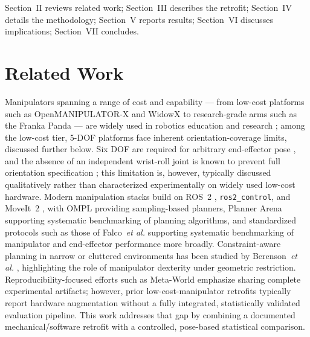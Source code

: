 \documentclass[conference]{IEEEtran}
\begin{document}
	Section~II reviews related work; Section~III describes the retrofit;
	Section~IV details the methodology; Section~V reports results;
	Section~VI discusses implications; Section~VII concludes.
	
	\section{Related Work}
	\label{sec:related_work}
	
	Manipulators spanning a range of cost and capability — from
	low-cost platforms such as OpenMANIPULATOR-X
	\cite{robotis2023openmanipulator} and WidowX \cite{zhao2021widowx} to
	research-grade arms such as the Franka Panda \cite{franka2023panda} —
	are widely used in robotics education and research
	\cite{muepu2025toward}; among the low-cost tier, 5-DOF platforms
	face inherent orientation-coverage limits, discussed further below.
	Six DOF are required for arbitrary end-effector pose
	\cite{craig2005introduction}, and the absence of an independent
	wrist-roll joint is known to prevent full orientation specification
	\cite{craig2005introduction, whitney1969resolved}; this limitation is,
	however, typically discussed qualitatively rather than characterized
	experimentally on widely used low-cost hardware. Modern manipulation
	stacks build on ROS~2 \cite{macenski2022ros2control},
	\texttt{ros2\_control}, and MoveIt~2 \cite{chitta2016moveit}, with
	OMPL \cite{sucan2012ompl} providing sampling-based planners,
	Planner Arena \cite{plannerarena} supporting systematic benchmarking
	of planning algorithms, and standardized protocols such as those of
	Falco~\textit{et al.} \cite{norton2020developing} supporting
	systematic benchmarking of manipulator and end-effector performance
	more broadly. Constraint-aware planning in narrow or cluttered
	environments has
	been studied by Berenson~\textit{et al.} \cite{berenson2011task},
	highlighting the role of manipulator dexterity under geometric
	restriction. Reproducibility-focused efforts such as Meta-World
	\cite{benchmarkrobotlearning} emphasize sharing complete experimental
	artifacts; however, prior low-cost-manipulator retrofits typically
	report hardware augmentation without a fully integrated,
	statistically validated evaluation pipeline. This work addresses that
	gap by combining a documented mechanical/software retrofit with a
	controlled, pose-based statistical comparison.
	
\end{document}
